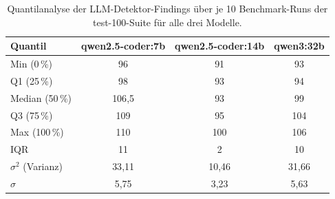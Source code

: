 \begin{table}[htbp]
\centering
\setlength{\tabcolsep}{4pt}
\renewcommand{\arraystretch}{1.2}
\caption[Quantilanalyse der LLM-Findings (test-100, alle Modelle)]{Quantilanalyse der LLM-Detektor-Findings über je 10 Benchmark-Runs der test-100-Suite für alle drei Modelle.}
\begin{tabular}{|l|c|c|c|}
\hline
\textbf{Quantil} & \textbf{qwen2.5-coder:7b} & \textbf{qwen2.5-coder:14b} & \textbf{qwen3:32b} \\
\hline
Min (0\,\%)      &  96 &  91 &  93 \\
\hline
Q1 (25\,\%)      &  98 &  93 &  94 \\
\hline
Median (50\,\%)  & 106{,}5 & 93 & 99 \\
\hline
Q3 (75\,\%)      & 109 &  95 & 104 \\
\hline
Max (100\,\%)    & 110 & 100 & 106 \\
\hline
\ac{IQR}         &  11 &   2 &  10 \\
\hline
$\sigma^2$ (Varianz) & 33{,}11 & 10{,}46 & 31{,}66 \\
\hline
$\sigma$         & 5{,}75 & 3{,}23 & 5{,}63 \\
\hline
\end{tabular}
\label{tab:statistik_quantile_100}
\end{table}
 
\clearpage